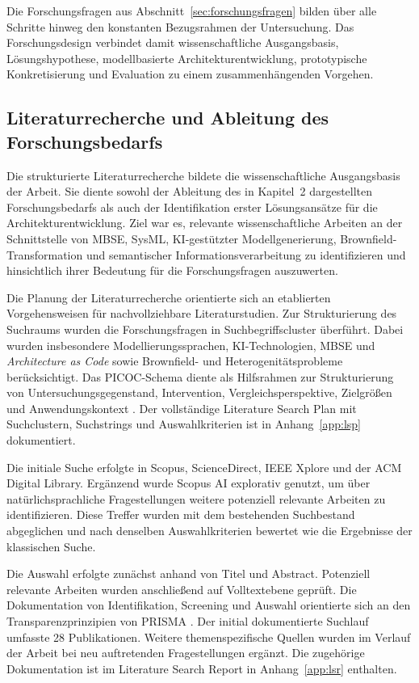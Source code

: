 Die Forschungsfragen aus Abschnitt~\ref{sec:forschungsfragen} bilden über
alle Schritte hinweg den konstanten Bezugsrahmen der Untersuchung. Das
Forschungsdesign verbindet damit wissenschaftliche Ausgangsbasis,
Lösungshypothese, modellbasierte Architekturentwicklung, prototypische
Konkretisierung und Evaluation zu einem zusammenhängenden Vorgehen.

\subsection{Literaturrecherche und Ableitung des Forschungsbedarfs}
\label{sec:literaturmethodik}

Die strukturierte Literaturrecherche bildete die wissenschaftliche
Ausgangsbasis der Arbeit. Sie diente sowohl der Ableitung des in Kapitel~2
dargestellten Forschungsbedarfs als auch der Identifikation erster
Lösungsansätze für die Architekturentwicklung. Ziel war es, relevante
wissenschaftliche Arbeiten an der Schnittstelle von MBSE, SysML,
KI-gestützter Modellgenerierung, Brownfield-Transformation und semantischer
Informationsverarbeitung zu identifizieren und hinsichtlich ihrer Bedeutung
für die Forschungsfragen auszuwerten.

Die Planung der Literaturrecherche orientierte sich an etablierten
Vorgehensweisen für nachvollziehbare Literaturstudien. Zur Strukturierung des
Suchraums wurden die Forschungsfragen in Suchbegriffscluster überführt. Dabei
wurden insbesondere Modellierungssprachen, KI-Technologien, MBSE und
\emph{Architecture as Code} sowie Brownfield- und Heterogenitätsprobleme
berücksichtigt. Das PICOC-Schema diente als Hilfsrahmen zur Strukturierung von
Untersuchungsgegenstand, Intervention, Vergleichsperspektive, Zielgrößen und
Anwendungskontext \cite{KitchenhamCharters2007}. Der vollständige Literature
Search Plan mit Suchclustern, Suchstrings und Auswahlkriterien ist in
Anhang~\ref{app:lsp} dokumentiert.

Die initiale Suche erfolgte in Scopus, ScienceDirect, IEEE Xplore und der ACM
Digital Library. Ergänzend wurde Scopus AI explorativ genutzt, um über
natürlichsprachliche Fragestellungen weitere potenziell relevante Arbeiten zu
identifizieren. Diese Treffer wurden mit dem bestehenden Suchbestand
abgeglichen und nach denselben Auswahlkriterien bewertet wie die Ergebnisse
der klassischen Suche.

Die Auswahl erfolgte zunächst anhand von Titel und Abstract. Potenziell
relevante Arbeiten wurden anschließend auf Volltextebene geprüft. Die
Dokumentation von Identifikation, Screening und Auswahl orientierte sich an
den Transparenzprinzipien von PRISMA \cite{Page2021}. Der initial
dokumentierte Suchlauf umfasste 28 Publikationen. Weitere themenspezifische
Quellen wurden im Verlauf der Arbeit bei neu auftretenden Fragestellungen
ergänzt. Die zugehörige Dokumentation ist im Literature Search Report in
Anhang~\ref{app:lsr} enthalten.

